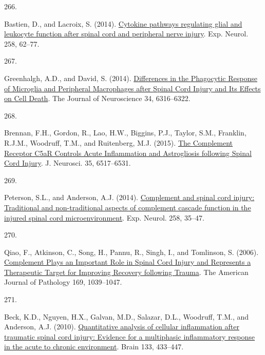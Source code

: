 \documentclass[
]{article}
\newlength{\cslhangindent}
\newlength{\csllabelwidth}
\newlength{\cslentryspacingunit} %
\newenvironment{CSLReferences}[2] %
 {%
  \setlength{\parindent}{0pt}
  \ifodd #1
  \let\oldpar\par
  \def\par{\hangindent=\cslhangindent\oldpar}
  \fi
  \setlength{\parskip}{#2\cslentryspacingunit}
 }%
 {}
\newcommand{\CSLLeftMargin}[1]{\parbox[t]{\csllabelwidth}{#1}}
\newcommand{\CSLRightInline}[1]{\parbox[t]{\linewidth - \csllabelwidth}{#1}\break}
\begin{document}
\begin{CSLReferences}{0}{0}
\leavevmode{}%
\CSLLeftMargin{266. }
\CSLRightInline{Bastien, D., and Lacroix, S. (2014). \href{https://doi.org/10.1016/j.expneurol.2014.04.006}{Cytokine pathways regulating glial and leukocyte function after spinal cord and peripheral nerve injury}. Exp. Neurol. 258, 62--77.}

\leavevmode{}%
\CSLLeftMargin{267. }
\CSLRightInline{Greenhalgh, A.D., and David, S. (2014). \href{https://doi.org/10.1523/JNEUROSCI.4912-13.2014}{Differences in the {Phagocytic Response} of {Microglia} and {Peripheral Macrophages} after {Spinal Cord Injury} and {Its Effects} on {Cell Death}}. The Journal of Neuroscience 34, 6316--6322.}

\leavevmode{}%
\CSLLeftMargin{268. }
\CSLRightInline{Brennan, F.H., Gordon, R., Lao, H.W., Biggins, P.J., Taylor, S.M., Franklin, R.J.M., Woodruff, T.M., and Ruitenberg, M.J. (2015). \href{https://doi.org/10.1523/JNEUROSCI.5218-14.2015}{The {Complement Receptor C5aR Controls Acute Inflammation} and {Astrogliosis} following {Spinal Cord Injury}}. J. Neurosci. 35, 6517--6531.}

\leavevmode{}%
\CSLLeftMargin{269. }
\CSLRightInline{Peterson, S.L., and Anderson, A.J. (2014). \href{https://doi.org/10.1016/j.expneurol.2014.04.028}{Complement and spinal cord injury: {Traditional} and non-traditional aspects of complement cascade function in the injured spinal cord microenvironment}. Exp. Neurol. 258, 35--47.}

\leavevmode{}%
\CSLLeftMargin{270. }
\CSLRightInline{Qiao, F., Atkinson, C., Song, H., Pannu, R., Singh, I., and Tomlinson, S. (2006). \href{https://doi.org/10.2353/ajpath.2006.060248}{Complement {Plays} an {Important Role} in {Spinal Cord Injury} and {Represents} a {Therapeutic Target} for {Improving Recovery} following {Trauma}}. The American Journal of Pathology 169, 1039--1047.}

\leavevmode{}%
\CSLLeftMargin{271. }
\CSLRightInline{Beck, K.D., Nguyen, H.X., Galvan, M.D., Salazar, D.L., Woodruff, T.M., and Anderson, A.J. (2010). \href{https://doi.org/10.1093/brain/awp322}{Quantitative analysis of cellular inflammation after traumatic spinal cord injury: Evidence for a multiphasic inflammatory response in the acute to chronic environment}. Brain 133, 433--447.}


\end{CSLReferences}
\end{document}
